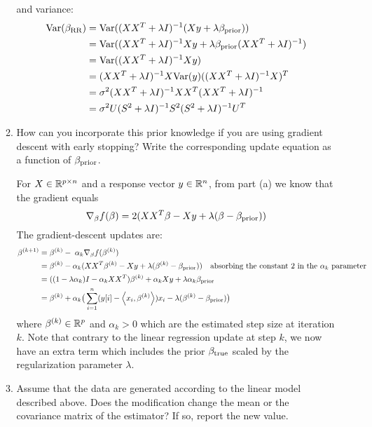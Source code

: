 \documentclass[12pt,twoside]{article}
\begin{document}
\begin{enumerate}
\begin{enumerate}
and variance:	
\begin{align*}
	\Var(\beta_{\op{RR}})	&=	\Var( (X X^T  +  \lambda I)^{-1} (X y + \lambda \beta_{\op{prior}})) \\
						&=	\Var( (X X^T  +  \lambda I)^{-1}  X y + \lambda  \beta_{\op{prior}} (X X^T  +  \lambda I)^{-1} ) \\
						&=	\Var( (X X^T  +  \lambda I)^{-1}  X y) \\
						&=	(X X^T  +  \lambda I)^{-1}  X \var(y)	((X X^T  +  \lambda I)^{-1}  X)^T \\
						&=	\sigma^2 (X X^T  +  \lambda I)^{-1}  X X^T (X X^T  +  \lambda I)^{-1} \\
						&=	\sigma^2 U (S^2 + \lambda I)^{-1} S^2 (S^2 + \lambda I)^{-1} U^T		
\end{align*}					
   
    \item How can you incorporate this prior knowledge if you are using gradient descent with early stopping? Write the corresponding update equation as a function of $\beta_{\operatorname{prior}}$.\\
\medskip

For $X  \in \mathbb{R}^{p \times n}$ and a response vector $y \in \mathbb{R}^n$, from part (a) we know that the gradient equals $$\nabla_{\beta} f(\beta) =	2 (X X^T \beta - X y +  \lambda (\beta - \beta_{\operatorname{prior}}))$$
The gradient-descent updates are:
\begin{align*}
		\beta^{(k+1)}	&=	\beta^{(k)} - \; \alpha_k \nabla_{\beta} f(\beta^{(k)})	\\
					&=	\beta^{(k)}  - \alpha_k (X X^T \beta^{(k)} - X y +  \lambda (\beta^{(k)} - \beta_{\operatorname{prior}})) \text{ ~ absorbing the constant } 2 \text{ in the } \alpha _k \text{ parameter } \\
					&=    ((1- \lambda \alpha_k) I  - \alpha_k X X^T) \beta^{(k)}  +  \alpha_k  X y  + \lambda  \alpha_k  \beta_{\operatorname{prior}} \\
					&=	 \beta^{(k)}  +  \alpha_k  \big( \sum_{i=1}^n (y[i] - \left \langle x_i, \beta^{(k)}\right \rangle) x_i - \lambda ( \beta^{(k)}  -   \beta_{\operatorname{prior}}) \big)
\end{align*}
   where $\beta^{(k)} \in \mathbb{R}^p$ and $ \alpha_k > 0$ which are the estimated step size at iteration $k$. Note that contrary to the linear regression update at step $k$, we now have an extra term 
   which includes the prior $\beta_{\operatorname{true}}$ scaled by the regularization parameter $\lambda$.
    
    \item Assume that the data are generated according to the linear model described above. Does the modification change the mean or the covariance matrix of the estimator? If so, report the new value.\\
    

\end{enumerate}
\end{enumerate}
\end{document}
